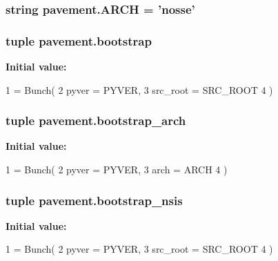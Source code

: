 \subsubsection[{A\+R\+C\+H}]{\setlength{\rightskip}{0pt plus 5cm}string pavement.\+A\+R\+C\+H = 'nosse'}\label{namespacepavement_af9b61ef3b4f366988b3f22be0a52eeb6}
\hypertarget{namespacepavement_afd7cf56b49905c839c296db9350d1c49}{}
\subsubsection[{bootstrap}]{\setlength{\rightskip}{0pt plus 5cm}tuple pavement.\+bootstrap}\label{namespacepavement_afd7cf56b49905c839c296db9350d1c49}
{\bfseries Initial value\+:}
\begin{DoxyCode}
1 = Bunch(
2         pyver = PYVER,
3         src\_root = SRC\_ROOT
4     )
\end{DoxyCode}
\hypertarget{namespacepavement_a53c9cb1169160b2723dbc14bfd9f59b8}{}
\subsubsection[{bootstrap\+\_\+arch}]{\setlength{\rightskip}{0pt plus 5cm}tuple pavement.\+bootstrap\+\_\+arch}\label{namespacepavement_a53c9cb1169160b2723dbc14bfd9f59b8}
{\bfseries Initial value\+:}
\begin{DoxyCode}
1 = Bunch(
2         pyver = PYVER,
3         arch = ARCH
4     )
\end{DoxyCode}
\hypertarget{namespacepavement_a749c3a2666192fd74e3cdc0a4d9f1a12}{}
\subsubsection[{bootstrap\+\_\+nsis}]{\setlength{\rightskip}{0pt plus 5cm}tuple pavement.\+bootstrap\+\_\+nsis}\label{namespacepavement_a749c3a2666192fd74e3cdc0a4d9f1a12}
{\bfseries Initial value\+:}
\begin{DoxyCode}
1 = Bunch(
2         pyver = PYVER,
3         src\_root = SRC\_ROOT
4     )
\end{DoxyCode}
\hypertarget{namespacepavement_a532e8b94130cb5287bc214b21aae0198}{}
